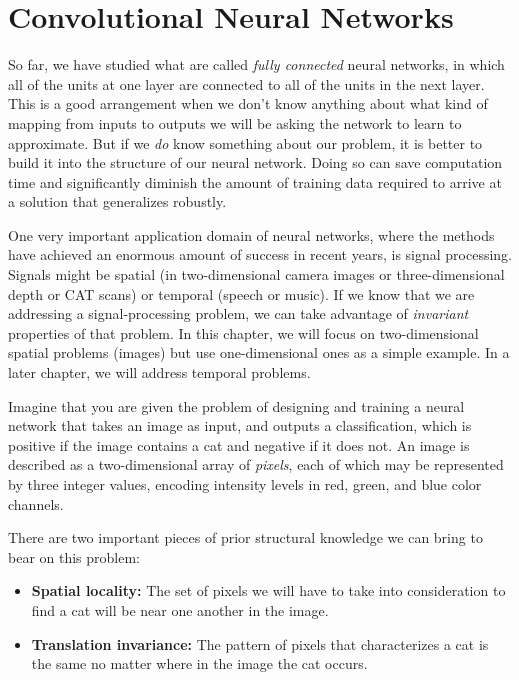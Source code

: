 \chapter{Convolutional Neural Networks}
\label{chap-cnn}

So far, we have studied what are called {\em fully connected} neural
networks, in which all of the units at one layer are connected to all
of the units in the next layer. This is a good arrangement when we
don't know anything about what kind of mapping from inputs to outputs
we will be asking the network to learn to approximate.  But if we {\em
    do} know something about our problem, it is better to build it into
the structure of our neural network.  Doing so can save
computation time and significantly diminish the amount of training
data required to arrive at a solution that generalizes robustly.

One very important application domain of neural networks, where the
methods have achieved an enormous amount of success in recent years,
is signal processing.  Signals might be spatial (in two-dimensional
camera images or three-dimensional depth or CAT scans) or temporal
(speech or music).   If we know that we are addressing a
signal-processing problem, we can take advantage of {\em invariant}
properties of that problem.  In this chapter, we will focus on
two-dimensional spatial problems (images) but use one-dimensional ones
as a simple example.  In a later chapter, we will address temporal problems.

Imagine that you are given the problem of designing and training a
neural network that takes an image as input, and outputs a
classification, which is positive if the image contains a cat and
negative if it does not.  An image is described as a two-dimensional
array of {\em pixels},
each of which may be represented by three integer values, encoding
intensity levels in red, green, and blue color channels.

There are two important pieces of prior structural knowledge
we can bring to bear on this problem:
\begin{itemize}
  \item{\bf Spatial locality:}  The set of pixels we will have to take
        into consideration to find a cat will be near one another in the
        image. 

  \item{\bf Translation invariance:}  The pattern of pixels that
        characterizes a cat is the same no matter where in the image the cat
        occurs. 
\end{itemize}


